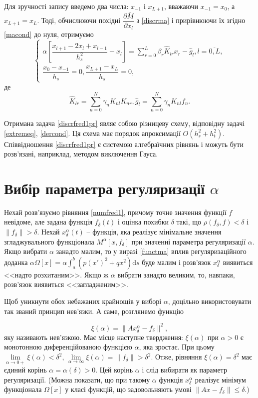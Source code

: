 \documentclass[14pt,twoside]{extreport}
\theoremstyle{mystyle}
\numberwithin{equation}{chapter}
\begin{document}
Для зручності запису введемо два числа: $x_{-1}$ і $x_{L+1}$, вважаючи $x_{-1}=x_0$, а $x_{L+1} = x_L$. Тоді, обчислюючи похідні $\dfrac{\partial \bar{M}}{\partial x_l}$ з \eqref{discrma} і прирівнюючи їх згідно \eqref{macond} до нуля, отримуємо 
\begin{equation}\label{discrfred1pr}
 \left\{
\begin{array}{l}
 \alpha\left[\dfrac{x_{l+1} - 2 x_l + x_{l-1}}{h_s^2} - x_l\right] = \sum\limits_{r=0}^{L} \beta_r \hat{K}_{lr} x_r - \hat{g}_l, l=\overline{0, L},\\
 \dfrac{x_0-x_{-1}}{h_s} = 0, \dfrac{x_{L+1} - x_L}{h_s} = 0,
\end{array}
\right.
\end{equation}
де
\[
 \hat{K}_{lr} = \sum\limits_{n=0}^{N} \gamma_n K_{nl}K_{nr}, \hat{g}_l = \sum\limits_{n=0}^{N} \gamma_nK_{nl}f_n.
\]

Отримана задача \eqref{discrfred1pr} являє собою різницеву схему, відповідну задачі \eqref{extremeq}, \eqref{dercond}. Ця схема має порядок апроксимації $O(h_s^2 + h_t^2)$. Співвідношення \eqref{discrfred1pr} є системою алгебраїчних рівнянь і можуть бути розв'язані, наприклад, методом виключення Гауса.

\section{Вибір параметра регуляризації \texorpdfstring{$\alpha$}{alpha}}

Нехай розв'язуємо рівняння \eqref{numfred1}, причому точне значення функції $f$ невідоме, але задана функція $f_\delta (t)$ і оцінка похибки $\delta$ такі, що $\rho(f_\delta, f) < \delta$ і $\|f_\delta\| > \delta$. Нехай $x_\delta^\alpha (t)$ -- функція, яка реалізує мінімальне значення згладжувального функціонала $M^{\alpha} [x, f_\delta]$ при значенні параметра регуляризації $\alpha$. Якщо вибрати $\alpha$ занадто малим, то у виразі \eqref{functma} вплив регуляризаційного доданка $\alpha \Omega[x] = \alpha \int_{a}^{b} (p(x')^2 + qx^2)\mathrm{d}s$ буде малим і розв'язок $x_\delta^\alpha$ виявиться <<надто розхитаним>>. Якщо ж $\alpha$ вибрати занадто великим, то, навпаки, розв'язок виявиться <<загладженим>>.

Щоб уникнути обох небажаних крайнощів у виборі $\alpha$, доцільно використовувати так званий принцип нев'язки. А саме, розглянемо функцію

\begin{equation}\label{discrepancy}
 \xi(\alpha) = \|Ax_\delta^\alpha - f_\delta\|^2,
\end{equation}
яку називають нев'язкою. Має місце наступне твердження: $\xi(\alpha)$ при $\alpha > 0$ є монотонною диференційованою функцією $\alpha$, яка зростає. При цьому $\lim\limits_{\alpha \to 0+} \xi(\alpha) < \delta^2$, $\lim\limits_{\alpha \to \infty} \xi(\alpha) = \|f_\delta\| > \delta^2$. Отже, рівняння $\xi(\alpha) = \delta^2$ має єдиний корінь $\alpha = \alpha(\delta) > 0$. Цей корінь $\alpha$ і слід вибирати як параметр регуляризації. (Можна показати, що при такому $\alpha$ функція $x_\delta^\alpha$ реалізує мінімум функціонала $\Omega[x]$ у класі функцій, що задовольняють умові $\|Ax - f_\delta\| \leqslant \delta$.)
\end{document}
